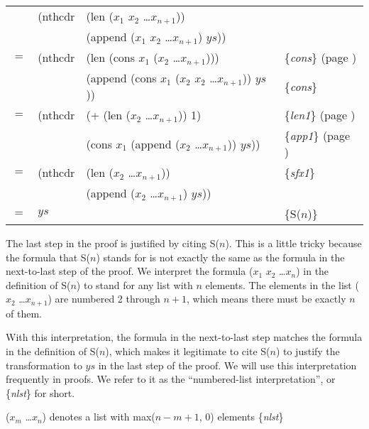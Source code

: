 \begin{center}
\begin{tabular}{llll}
    & (nthcdr & (len ($x_1$ $x_2$ \dots $x_{n+1}$))          & \\
    &         & (append ($x_1$ $x_2$ \dots $x_{n+1}$) $ys$)) & \\
$=$ & (nthcdr & (len (cons $x_1$ ($x_2$ \dots $x_{n+1}$)))          & \{\emph{cons}\} (page \pageref{cons-axiom-informal}) \\
    &         & (append (cons $x_1$ ($x_2$ $x_2$ \dots $x_{n+1}$)) $ys$)) & \{\emph{cons}\}                                    \\
$=$ & (nthcdr & (+ (len ($x_2$ \dots $x_{n+1}$)) 1)                 & \{\emph{len1}\} (page \pageref{len-equations})       \\
    &         & (cons $x_1$ (append ($x_2$ \dots $x_{n+1}$)) $ys$)) & \{\emph{app1}\} (page \pageref{append-equations})    \\
$=$ & (nthcdr & (len ($x_2$ \dots $x_{n+1}$))                       & \{\emph{sfx1}\}                                          \\
    &         & (append ($x_2$ \dots $x_{n+1}$) $ys$))              &                                                          \\
$=$ & $ys$    &                                                     & \{S($n$)\}                                              \\
\end{tabular}
\end{center}

The last step in the proof is justified by citing S($n$). This is a little tricky because the formula that S($n$) stands for is not exactly the same as the formula in the next-to-last step of the proof. We interpret the formula ($x_1$ $x_2$ \dots $x_n$) in the definition of S($n$) to stand for any list with $n$ elements. The elements in the list ($x_2$ \dots $x_{n+1}$) are numbered 2 through $n+1$, which means there must be exactly $n$ of them.

With this interpretation, the formula in the next-to-last step matches the formula in the definition of S($n$), which makes it legitimate to cite S($n$) to justify the transformation to $ys$ in the last step of the proof. We will use this interpretation frequently in proofs. We refer to it as the ``numbered-list interpretation'', or \{\emph{nlst}\} for short.

\label{numbered-list-interpretation}
\begin{center}
($x_m$ \dots $x_n$) denotes a list with max($n-m+1$, 0) elements \{\emph{nlst}\}
\end{center}

